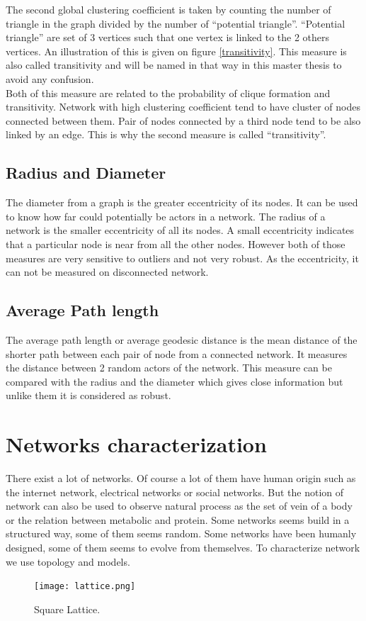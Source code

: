 \documentclass[a4paper, 12pt]{report}
\begin{document}
The second global clustering coefficient is taken by counting the number of triangle in the graph divided by the number of ``potential triangle''. ``Potential triangle'' are set of 3 vertices such that one vertex is linked to the 2 others vertices. An illustration of this is given on figure \ref{transitivity}. This measure is also called  transitivity and will be named in that way in this master thesis to avoid any confusion. \\

Both of this measure are related to the probability of clique formation and transitivity. Network with high clustering coefficient tend to have cluster of nodes connected between them. Pair of nodes connected by a third node tend to be also linked by an edge. This is why the second measure is called ``transitivity''.\\

\subsection{Radius and Diameter}
The diameter from a graph is the greater eccentricity of its nodes. It can be used to know how far could potentially be actors in a network. The radius of a network is the smaller eccentricity of all its nodes. A small eccentricity indicates that a particular node is  near from all the other nodes. However both of those measures are very sensitive to outliers and not very robust. As the eccentricity, it can not be measured on disconnected network.

\subsection{Average Path length}
The average path length \citep{path_length} or average geodesic distance is the mean distance of the shorter path between each pair of node from a connected network. It measures the distance between 2 random actors of the network. This measure can be compared with the radius and the diameter which gives close information but unlike them it is considered as robust.
 
\section{Networks characterization}
There exist a lot of networks. Of course a lot of them have human origin such as the internet network, electrical networks or social networks. But the notion of network can also be used to observe natural process as the set of vein of a body or the relation between metabolic and protein. Some networks seems build in a structured way, some of them seems random. Some networks have been humanly designed, some of them seems to evolve from themselves. To characterize network we use topology and models.\\
\begin{figure}
\centering
\texttt{[image: lattice.png]}
\caption{Square Lattice. \citep{complex_networks} }
\label{lattice}
\end{figure}
\end{document}
